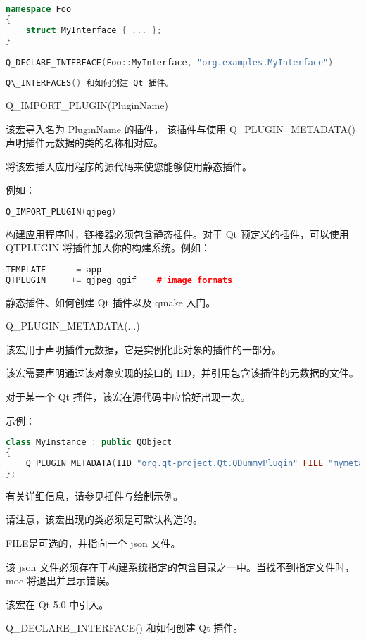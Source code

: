\begin{lstlisting}[language=C++]
namespace Foo
{
    struct MyInterface { ... };
}

Q_DECLARE_INTERFACE(Foo::MyInterface, "org.examples.MyInterface")
\end{lstlisting}

\begin{lstlisting}[language=C++]
Q\_INTERFACES() 和如何创建 Qt 插件。
\end{lstlisting}

Q\_IMPORT\_PLUGIN(PluginName)

该宏导入名为 PluginName 的插件，
该插件与使用 Q\_PLUGIN\_METADATA() 声明插件元数据的类的名称相对应。

将该宏插入应用程序的源代码来使您能够使用静态插件。

例如：

\begin{lstlisting}[language=C++]
Q_IMPORT_PLUGIN(qjpeg)
\end{lstlisting}

构建应用程序时，链接器必须包含静态插件。对于 Qt 预定义的插件，可以使用 QTPLUGIN 将插件加入你的构建系统。例如：

\begin{lstlisting}[language=C++]
TEMPLATE      = app
QTPLUGIN     += qjpeg qgif    # image formats
\end{lstlisting}


\begin{seeAlso}
 静态插件、如何创建 Qt 插件以及 qmake 入门。
\end{seeAlso}

Q\_PLUGIN\_METADATA(...)

该宏用于声明插件元数据，它是实例化此对象的插件的一部分。

该宏需要声明通过该对象实现的接口的 IID，并引用包含该插件的元数据的文件。

对于某一个 Qt 插件，该宏在源代码中应恰好出现一次。

示例：

\begin{lstlisting}[language=C++]
class MyInstance : public QObject
{
    Q_PLUGIN_METADATA(IID "org.qt-project.Qt.QDummyPlugin" FILE "mymetadata.json")
};
\end{lstlisting}

有关详细信息，请参见插件与绘制示例。

请注意，该宏出现的类必须是可默认构造的。

FILE是可选的，并指向一个 json 文件。

该 json 文件必须存在于构建系统指定的包含目录之一中。当找不到指定文件时，moc 将退出并显示错误。

该宏在 Qt 5.0 中引入。

\begin{seeAlso}
Q\_DECLARE\_INTERFACE() 和如何创建 Qt 插件。
\end{seeAlso}